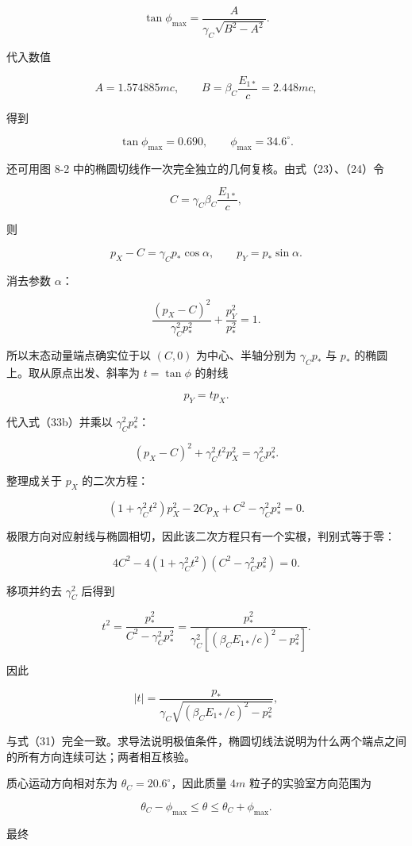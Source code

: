 \documentclass[12pt,a4paper,UTF8]{ctexart}
\begin{document}
\[
\tan\phi_{\max}
=\frac{A}{\gamma_C\sqrt{B^2-A^2}}.
\tag{31}
\]

代入数值

\[
A=1.574885mc,
\qquad
B=\beta_C\frac{E_{1*}}c
=2.448mc,
\tag{32}
\]

得到

\[
\tan\phi_{\max}=0.690,
\qquad
\boxed{\phi_{\max}=34.6^\circ}.
\tag{33}
\]

还可用图 8-2 中的椭圆切线作一次完全独立的几何复核。由式（23）、（24）令

\[
C=\gamma_C\beta_C\frac{E_{1*}}c,
\]

则

\[
p_X-C=\gamma_Cp_*\cos\alpha,
\qquad
p_Y=p_*\sin\alpha.
\tag{33a}
\]

消去参数 \(\alpha\)：

\[
\boxed{
\frac{(p_X-C)^2}{\gamma_C^2p_*^2}
+\frac{p_Y^2}{p_*^2}=1
}.
\tag{33b}
\]

所以末态动量端点确实位于以 \((C,0)\) 为中心、半轴分别为 \(\gamma_Cp_*\)
与 \(p_*\) 的椭圆上。取从原点出发、斜率为 \(t=\tan\phi\) 的射线

\[
p_Y=tp_X.
\tag{33c}
\]

代入式（33b）并乘以 \(\gamma_C^2p_*^2\)：

\[
(p_X-C)^2+\gamma_C^2t^2p_X^2
=\gamma_C^2p_*^2.
\tag{33d}
\]

整理成关于 \(p_X\) 的二次方程：

\[
(1+\gamma_C^2t^2)p_X^2
-2Cp_X+C^2-\gamma_C^2p_*^2=0.
\tag{33e}
\]

极限方向对应射线与椭圆相切，因此该二次方程只有一个实根，判别式等于零：

\[
4C^2-4(1+\gamma_C^2t^2)
(C^2-\gamma_C^2p_*^2)=0.
\tag{33f}
\]

移项并约去 \(\gamma_C^2\) 后得到

\[
t^2
=\frac{p_*^2}{C^2-\gamma_C^2p_*^2}
=\frac{p_*^2}
{\gamma_C^2[(\beta_CE_{1*}/c)^2-p_*^2]}.
\tag{33g}
\]

因此

\[
|t|
=\frac{p_*}
{\gamma_C\sqrt{(\beta_CE_{1*}/c)^2-p_*^2}},
\tag{33h}
\]

与式（31）完全一致。求导法说明极值条件，椭圆切线法说明为什么两个端点之间的所有方向连续可达；两者相互核验。

质心运动方向相对东为 \(\theta_C=20.6^\circ\)，因此质量 \(4m\)
粒子的实验室方向范围为

\[
\theta_C-\phi_{\max}
\le \theta\le
\theta_C+\phi_{\max}.
\tag{34}
\]

最终
\end{document}
